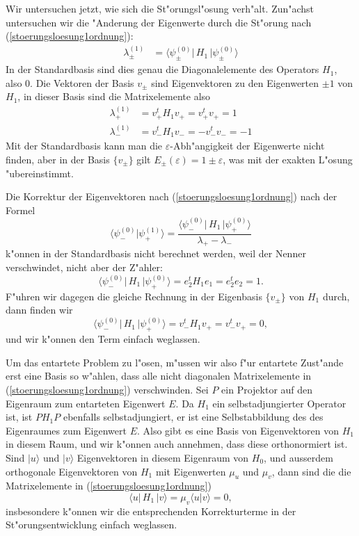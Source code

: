 \begin{beispiel}
Wir untersuchen jetzt, wie sich die St"orungsl"osung verh"alt.
Zun"achst untersuchen wir die "Anderung der Eigenwerte durch die
St"orung nach (\ref{stoerungsloesung1ordnung}):
\begin{align*}
\lambda_{\pm}^{(1)}
&=
\langle \psi_{\pm}^{(0)}|\, H_1 \,|\psi_{\pm}^{(0)}\rangle
\end{align*}
In der Standardbasis sind dies genau die Diagonalelemente des Operators $H_1$,
also $0$.
Die Vektoren der Basis $v_\pm$ sind Eigenvektoren zu den Eigenwerten
$\pm1$ von $H_1$, in dieser Basis sind die Matrixelemente also
\begin{align*}
\lambda_+^{(1)}
&=
v_+^tH_1v_+=v_+^tv_+=1\\
\lambda_-^{(1)}
&=
v_-^tH_1v_-=-v_-^tv_-=-1
\end{align*}
Mit der Standardbasis kann man die $\varepsilon$-Abh"angigkeit der
Eigenwerte nicht finden, aber in der Basis $\{v_\pm\}$ gilt
$E_\pm(\varepsilon)=1\pm\varepsilon$, was mit der exakten L"osung
"ubereinstimmt.

Die Korrektur der Eigenvektoren nach (\ref{stoerungsloesung1ordnung})
nach der Formel
\[
\langle\psi_-^{(0)}|\psi_+^{(1)}\rangle
=
\frac{
\langle\psi_-^{(0)}|\,H_1\,|\psi_+^{(0)}\rangle
}{
\lambda_+-\lambda_-
}
\]
k"onnen in der Standardbasis nicht berechnet werden, weil der Nenner
verschwindet, nicht aber der Z"ahler:
\[
\langle\psi_-^{(0)}|\,H_1\,|\psi_+^{(0)}\rangle
=
e_2^tH_1e_1=e_2^te_2=1.
\]
F"uhren wir dagegen die gleiche Rechnung in der Eigenbasis $\{v_\pm\}$
von $H_1$ durch, dann finden wir
\[
\langle\psi_-^{(0)}|\,H_1\,|\psi_+^{(0)}\rangle
=
v_-^tH_1v_+=v_-^tv_+=0,
\]
und wir k"onnen den Term einfach weglassen.
\end{beispiel}

Um das entartete Problem zu l"osen, m"ussen wir also f"ur entartete
Zust"ande erst eine Basis so w"ahlen, dass alle nicht
diagonalen Matrixelemente in (\ref{stoerungsloesung1ordnung}) verschwinden.
Sei $P$ ein Projektor auf den Eigenraum zum entarteten Eigenwert $E$.
Da $H_1$ ein selbstadjungierter Operator ist, ist $PH_1P$ ebenfalls
selbstadjungiert, er ist eine Selbstabbildung des des
Eigenraumes zum Eigenwert $E$.
Also gibt es eine Basis von Eigenvektoren von $H_1$ in diesem Raum,
und wir k"onnen auch annehmen, dass diese orthonormiert ist.
Sind $|u\rangle$ und $|v\rangle$ Eigenvektoren in diesem Eigenraum von
$H_0$, und ausserdem orthogonale Eigenvektoren von $H_1$ mit Eigenwerten
$\mu_u$ und $\mu_v$, dann sind die
die Matrixelemente in (\ref{stoerungsloesung1ordnung}) 
\[
\langle u|\,H_1\,|v\rangle = \mu_v\langle u|v\rangle=0,
\]
insbesondere k"onnen wir die entsprechenden Korrekturterme in der
St"orungsentwicklung einfach weglassen.

